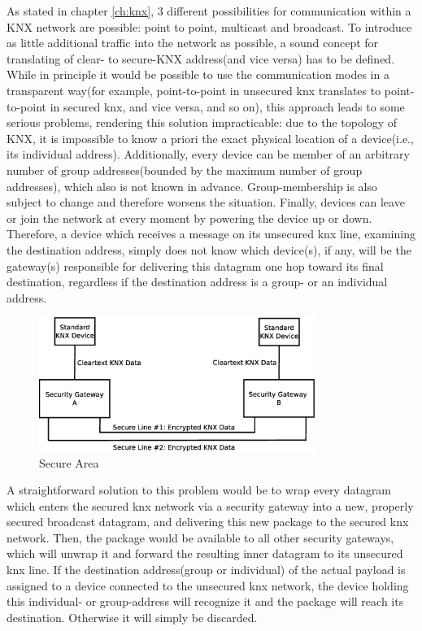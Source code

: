 As stated in chapter \ref{ch:knx}, 3 different possibilities for communication within a KNX network are possible: point to point, multicast and broadcast.
To introduce as little additional traffic into the network as possible, a sound concept for translating of clear- to secure-KNX address(and vice versa) has to
be defined. While in principle it would be possible to use the communication modes in a transparent way(for example, point-to-point in unsecured knx translates
to point-to-point in secured knx, and vice versa, and so on), this approach leads to some serious problems, rendering this solution impracticable:
due to the topology of KNX, it is impossible to know a priori the exact physical location of a device(i.e., its individual address). Additionally,
every device can be member of an arbitrary number of group addresses(bounded by the maximum number of group addresses), which also is not known in advance.
Group-membership is also subject to change and therefore worsens the situation. Finally, devices can leave or join the network at every moment by powering the
device up or down.
Therefore, a device which receives a message on its unsecured knx line, examining the destination address, simply does
not know which device(s), if any, will be the gateway(s) responsible for delivering this datagram one hop toward its final destination, regardless if the destination address
is a group- or an individual address.

\begin{figure}
    \centering
    \includegraphics[width=0.8\textwidth]{figures/SecureArea.eps}
    \caption{Secure Area}
    \label{fig:secArea}
\end{figure}

A straightforward solution to this problem would be to wrap every datagram which enters the secured knx network via a security gateway into a new, properly secured
broadcast datagram, and delivering this new package to the secured knx network. Then, the package would be available to all other security gateways, which
will unwrap it and forward the resulting inner datagram to its unsecured knx line. If the destination address(group or individual) of the actual payload
is assigned to a device connected
to the unsecured knx network, the device holding this individual- or group-address will recognize it and the package will reach its destination. 
Otherwise it will simply be discarded.

